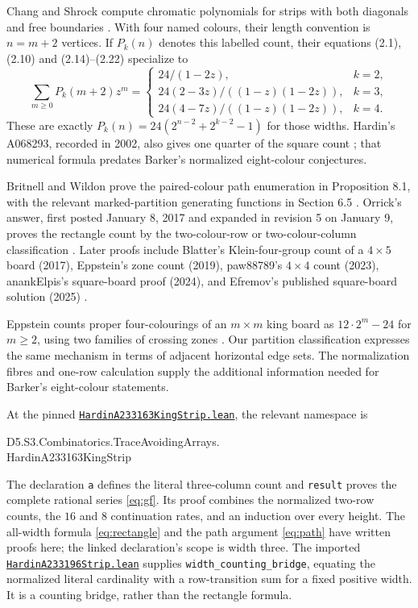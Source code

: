 \documentclass[11pt]{article}
\begin{document}
Chang and Shrock compute chromatic polynomials for strips with both
diagonals and free boundaries \cite[Section II]{chang-shrock}.
With four named colours, their length convention is $n=m+2$ vertices.
If $P_k(n)$ denotes this labelled count, their equations (2.1), (2.10)
and (2.14)--(2.22) specialize to
\[
 \sum_{m\geq0}P_k(m+2)z^m=
 \begin{cases}
 24/(1-2z),&k=2,\\
 24(2-3z)/((1-z)(1-2z)),&k=3,\\
 24(4-7z)/((1-z)(1-2z)),&k=4.
 \end{cases}
\]
These are exactly $P_k(n)=24(2^{n-2}+2^{k-2}-1)$ for those widths.
Hardin's A068293, recorded in 2002, also gives one quarter of the square
count \cite{square-data}; that numerical formula predates Barker's
normalized eight-colour conjectures.

Britnell and Wildon prove the paired-colour path enumeration in
Proposition 8.1, with the relevant marked-partition generating functions
in Section 6.5 \cite{britnell-wildon}.
Orrick's answer, first posted January 8, 2017 and expanded in revision 5
on January 9, proves the rectangle count by the two-colour-row or
two-colour-column classification \cite{orrick}.
Later proofs include Blatter's Klein-four-group count of a $4\times5$
board (2017), Eppstein's zone count (2019), paw88789's $4\times4$ count
(2023), anankElpis's square-board proof (2024), and Efremov's published
square-board solution (2025) \cite{later-counts,eppstein,efremov}.

Eppstein counts proper four-colourings of an $m\times m$ king board as
$12\cdot2^m-24$ for $m\geq2$, using two families of crossing zones
\cite[final two paragraphs]{eppstein}. Our partition classification
expresses the same mechanism in terms of adjacent horizontal edge sets.
The normalization fibres and one-row calculation supply the additional
information needed for Barker's eight-colour statements.

At the pinned
\href{https://github.com/the-omega-institute/trureturing/blob/0a197c5f83db6039a3c1177b20d31df4bfe95cd9/D5/S3/Combinatorics/TraceAvoidingArrays/HardinA233163KingStrip.lean}{\texttt{HardinA233163KingStrip.lean}},
the relevant namespace is
\begin{center}\small\ttfamily
D5.S3.Combinatorics.TraceAvoidingArrays.\\
HardinA233163KingStrip
\end{center}
The declaration \texttt{a} defines the literal three-column count and
\texttt{result} proves the complete rational series \eqref{eq:gf}.
Its proof combines the normalized two-row counts, the $16$ and $8$
continuation rates, and an induction over every height.
The all-width formula \eqref{eq:rectangle} and the path argument
\eqref{eq:path} have written proofs here; the linked declaration's
scope is width three.
The imported
\href{https://github.com/the-omega-institute/trureturing/blob/0a197c5f83db6039a3c1177b20d31df4bfe95cd9/D5/S3/Combinatorics/TraceAvoidingArrays/HardinA233196Strip.lean}{\texttt{HardinA233196Strip.lean}}
supplies \texttt{width\_counting\_bridge}, equating the normalized literal
cardinality with a row-transition sum for a fixed positive width.
It is a counting bridge, rather than the rectangle formula.
\end{document}
